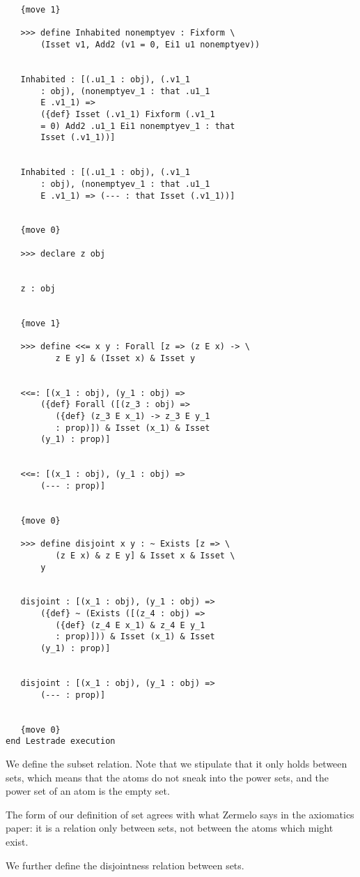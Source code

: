 \documentclass[12pt]{article}
\begin{document}
\begin{verbatim}
   {move 1}

   >>> define Inhabited nonemptyev : Fixform \
       (Isset v1, Add2 (v1 = 0, Ei1 u1 nonemptyev))


   Inhabited : [(.u1_1 : obj), (.v1_1 
       : obj), (nonemptyev_1 : that .u1_1 
       E .v1_1) => 
       ({def} Isset (.v1_1) Fixform (.v1_1 
       = 0) Add2 .u1_1 Ei1 nonemptyev_1 : that 
       Isset (.v1_1))]


   Inhabited : [(.u1_1 : obj), (.v1_1 
       : obj), (nonemptyev_1 : that .u1_1 
       E .v1_1) => (--- : that Isset (.v1_1))]


   {move 0}

   >>> declare z obj


   z : obj


   {move 1}

   >>> define <<= x y : Forall [z => (z E x) -> \
          z E y] & (Isset x) & Isset y


   <<=: [(x_1 : obj), (y_1 : obj) => 
       ({def} Forall ([(z_3 : obj) => 
          ({def} (z_3 E x_1) -> z_3 E y_1 
          : prop)]) & Isset (x_1) & Isset 
       (y_1) : prop)]


   <<=: [(x_1 : obj), (y_1 : obj) => 
       (--- : prop)]


   {move 0}

   >>> define disjoint x y : ~ Exists [z => \
          (z E x) & z E y] & Isset x & Isset \
       y


   disjoint : [(x_1 : obj), (y_1 : obj) => 
       ({def} ~ (Exists ([(z_4 : obj) => 
          ({def} (z_4 E x_1) & z_4 E y_1 
          : prop)])) & Isset (x_1) & Isset 
       (y_1) : prop)]


   disjoint : [(x_1 : obj), (y_1 : obj) => 
       (--- : prop)]


   {move 0}
end Lestrade execution
\end{verbatim}

We define the subset relation.  Note that we stipulate that it only holds between sets, which means that the atoms do not sneak into the power sets,
and the power set of an atom is the empty set.

The form of our definition of set agrees with what Zermelo says in the axiomatics paper:  it is a relation only between sets, not between the atoms which might exist. 

We further define the disjointness relation between sets.
\end{document}
